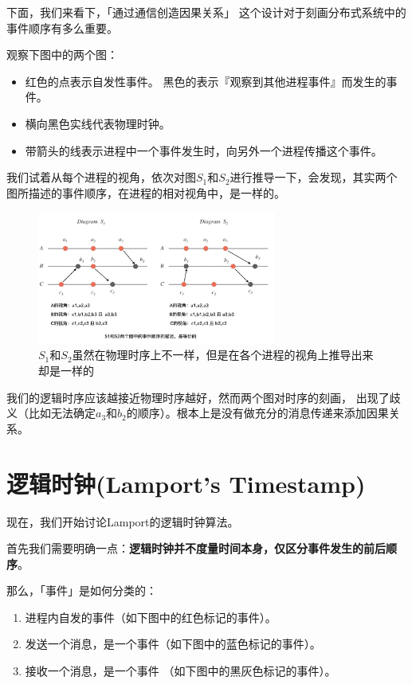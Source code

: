 \documentclass[cn,11pt,chinese]{elegantbook}
\begin{document}
下面，我们来看下，「通过通信创造因果关系」 这个设计对于刻画分布式系统中的事件顺序有多么重要。

观察下图中的两个图：

\begin{itemize}
    \item 红色的点表示自发性事件。 黑色的表示『观察到其他进程事件』而发生的事件。
    \item 横向黑色实线代表物理时钟。
    \item 带箭头的线表示进程中一个事件发生时，向另外一个进程传播这个事件。
\end{itemize}

我们试着从每个进程的视角，依次对图$S_1$和$S_2$进行推导一下，会发现，其实两个图所描述的事件顺序，在进程的相对视角中，是一样的。

\begin{figure}
    \centering
    \includegraphics[width=0.7\textwidth]{images/appendix-a-08.jpeg}
    \caption{$S_1$和$S_2$虽然在物理时序上不一样，但是在各个进程的视角上推导出来却是一样的}
\end{figure}

我们的逻辑时序应该越接近物理时序越好，然而两个图对时序的刻画， 出现了歧义（比如无法确定$a_3$和$b_2$的顺序）。根本上是没有做充分的消息传递来添加因果关系。

\section{逻辑时钟(Lamport’s Timestamp)}

现在，我们开始讨论Lamport的逻辑时钟算法。

首先我们需要明确一点：\textbf{逻辑时钟并不度量时间本身，仅区分事件发生的前后顺序}。

那么，「事件」是如何分类的：

\begin{enumerate}
    \item 进程内自发的事件（如下图中的红色标记的事件）。
    \item 发送一个消息，是一个事件（如下图中的蓝色标记的事件）。
    \item 接收一个消息，是一个事件 （如下图中的黑灰色标记的事件）。
\end{enumerate}
\end{document}
